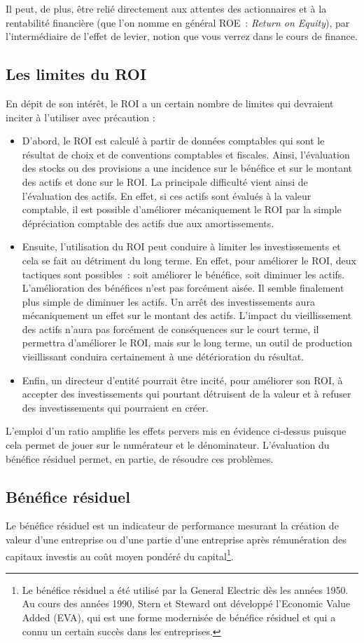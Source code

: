\documentclass[oneside]{kaobook}
\begin{document}
Il peut, de plus, être relié directement aux attentes des actionnaires et à la rentabilité financière (que l'on nomme en général ROE : \emph{Return on Equity}), par l'intermédiaire de l'effet de levier, notion que vous verrez dans le cours de finance.
\subsection{Les limites du ROI}
\label{sec:org867f9ee}
En dépit de son intérêt, le ROI a un certain nombre de limites qui devraient inciter à l'utiliser avec précaution : 
\begin{itemize}
\item D'abord, le ROI est calculé à partir de données comptables qui sont le résultat de choix et de conventions comptables et fiscales. Ainsi, l'évaluation des stocks ou des provisions a une incidence sur le bénéfice et sur le montant des actifs et donc sur le ROI. La principale difficulté vient ainsi de l'évaluation des actifs. En effet, si ces actifs sont évalués à la valeur comptable, il est possible d'améliorer mécaniquement le ROI par la simple dépréciation comptable des actifs due aux amortissements.
\item Ensuite, l'utilisation du ROI peut conduire à limiter les investissements et cela se fait au détriment du long terme. En effet, pour améliorer le ROI, deux tactiques sont possibles : soit améliorer le bénéfice, soit diminuer les actifs. L'amélioration des bénéfices n'est pas forcément aisée. Il semble finalement plus simple de diminuer les actifs. Un arrêt des investissements aura mécaniquement un effet sur le montant des actifs. L'impact du vieillissement des actifs n'aura pas forcément de conséquences sur le court terme, il permettra d'améliorer le ROI, mais sur le long terme, un outil de production vieillissant conduira certainement à une détérioration du résultat.
\item Enfin, un directeur d'entité pourrait être incité, pour améliorer son ROI, à accepter des investissements qui pourtant détruisent de la valeur et à refuser des investissements qui pourraient en créer.
\end{itemize}

L'emploi d'un ratio amplifie les effets pervers mis en évidence ci-dessus puisque cela permet de jouer sur le numérateur et le dénominateur. L'évaluation du bénéfice résiduel permet, en partie, de résoudre ces problèmes. 
\subsection{Bénéfice résiduel}
\label{sec:orgef6801f}
Le bénéfice résiduel est un indicateur de performance mesurant la création de valeur d'une entreprise ou d'une partie d'une entreprise après rémunération des capitaux investis au coût moyen pondéré du capital\footnote{Le bénéfice résiduel a été utilisé par la General Electric dès les années 1950. Au cours des années 1990, Stern et Steward ont développé l'Economic Value Added (EVA), qui est une forme modernisée de bénéfice résiduel et qui a connu un certain succès dans les entreprises.}. 
\end{document}
